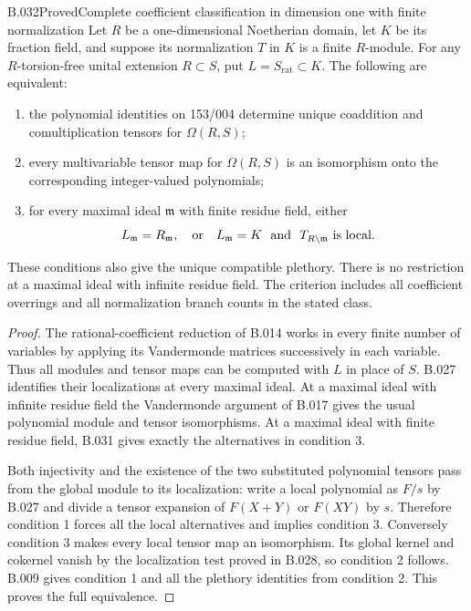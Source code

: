 \begin{saresult}{B.032}{Proved}{Complete coefficient classification in dimension one with finite normalization}
Let $R$ be a one-dimensional Noetherian domain, let $K$ be its
fraction field, and suppose its normalization $T$ in $K$ is a
finite $R$-module. For any $R$-torsion-free unital extension
$R\subset S$, put $L=S_{\mathrm{rat}}\subset K$.
The following are equivalent:
\begin{enumerate}
\item the polynomial identities on 153/004 determine unique
coaddition and comultiplication tensors for $\Omega(R,S)$;
\item every multivariable tensor map for $\Omega(R,S)$ is an
isomorphism onto the corresponding integer-valued polynomials;
\item for every maximal ideal $\mathfrak m$ with finite residue
field, either
\[
 L_{\mathfrak m}=R_{\mathfrak m},
 \quad\hbox{or}\quad
 L_{\mathfrak m}=K\ \hbox{ and }\ T_{R\setminus\mathfrak m}
       \hbox{ is local}.
\]
\end{enumerate}
These conditions also give the unique compatible plethory.
There is no restriction at a maximal ideal with infinite residue
field. The criterion includes all coefficient overrings and all
normalization branch counts in the stated class.
\end{saresult}
\begin{proof}
The rational-coefficient reduction of B.014 works in every finite
number of variables by applying its Vandermonde matrices
successively in each variable. Thus all modules and tensor maps
can be computed with $L$ in place of $S$.
B.027 identifies their localizations at every maximal ideal.
At a maximal ideal with infinite residue field the Vandermonde
argument of B.017 gives the usual polynomial module and tensor
isomorphisms. At a maximal ideal with finite residue field,
B.031 gives exactly the alternatives in condition 3.

Both injectivity and the existence of the two substituted
polynomial tensors pass from the global module to its localization:
write a local polynomial as $F/s$ by B.027 and divide a tensor
expansion of $F(X+Y)$ or $F(XY)$ by $s$.
Therefore condition 1 forces all the local alternatives and
implies condition 3. Conversely condition 3 makes every local
tensor map an isomorphism. Its global kernel and cokernel vanish
by the localization test proved in B.028, so condition 2 follows.
B.009 gives condition 1 and all the plethory identities from
condition 2. This proves the full equivalence.
\end{proof}


